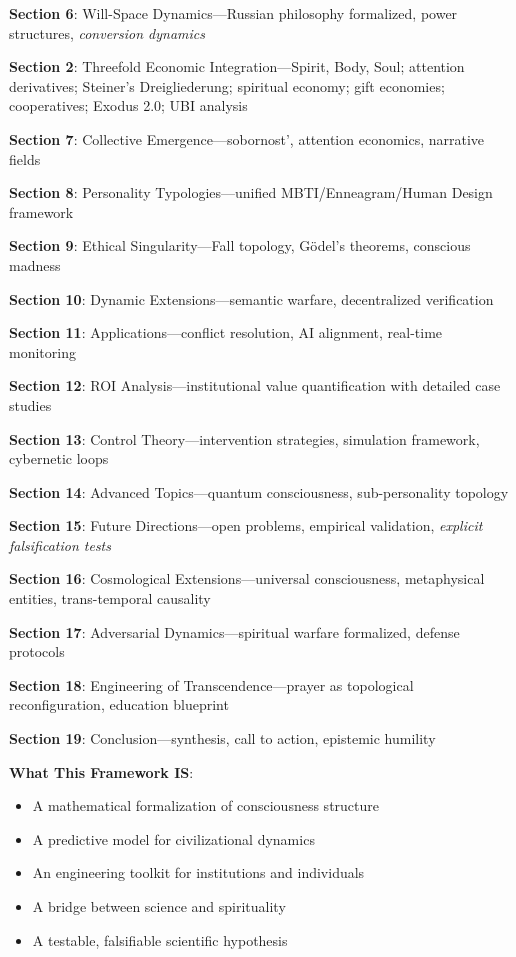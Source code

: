 \documentclass[11pt,a4paper]{article}
\theoremstyle{definition}
\theoremstyle{remark}
\begin{document}
\begin{small}
\textbf{Section 6}: Will-Space Dynamics—Russian philosophy formalized, power structures, \textit{conversion dynamics}

\textbf{Section 2}: Threefold Economic Integration—Spirit, Body, Soul; attention derivatives; Steiner's Dreigliederung; spiritual economy; gift economies; cooperatives; Exodus 2.0; UBI analysis

\textbf{Section 7}: Collective Emergence—sobornost', attention economics, narrative fields

\textbf{Section 8}: Personality Typologies—unified MBTI/Enneagram/Human Design framework

\textbf{Section 9}: Ethical Singularity—Fall topology, Gödel's theorems, conscious madness

\textbf{Section 10}: Dynamic Extensions—semantic warfare, decentralized verification

\textbf{Section 11}: Applications—conflict resolution, AI alignment, real-time monitoring

\textbf{Section 12}: ROI Analysis—institutional value quantification with detailed case studies

\textbf{Section 13}: Control Theory—intervention strategies, simulation framework, cybernetic loops

\textbf{Section 14}: Advanced Topics—quantum consciousness, sub-personality topology

\textbf{Section 15}: Future Directions—open problems, empirical validation, \textit{explicit falsification tests}

\textbf{Section 16}: Cosmological Extensions—universal consciousness, metaphysical entities, trans-temporal causality

\textbf{Section 17}: Adversarial Dynamics—spiritual warfare formalized, defense protocols

\textbf{Section 18}: Engineering of Transcendence—prayer as topological reconfiguration, education blueprint

\textbf{Section 19}: Conclusion—synthesis, call to action, epistemic humility


\begin{mdframed}[backgroundcolor=blue!5,linewidth=2pt]
\textbf{What This Framework IS}:
\begin{itemize}[nosep]
    \item A mathematical formalization of consciousness structure
    \item A predictive model for civilizational dynamics
    \item An engineering toolkit for institutions and individuals
    \item A bridge between science and spirituality
    \item A testable, falsifiable scientific hypothesis
\end{itemize}


\end{mdframed}
\end{small}
\end{document}
